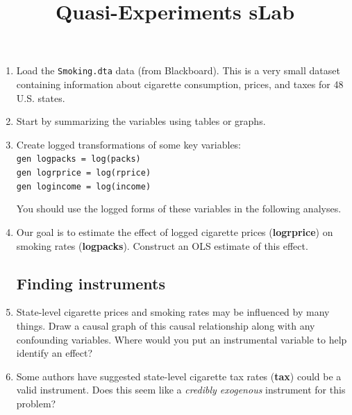 \documentclass[a4paper,12pt]{article}
\title{Quasi-Experiments sLab}
\author{}
\date{}
\begin{document}
\maketitle

\vspace{-4em}

\begin{enumerate}\itemsep0.5em

\section*{Instrumental Variables}

\item Load the \texttt{Smoking.dta} data (from Blackboard). This is a very small dataset containing information about cigarette consumption, prices, and taxes for 48 U.S. states.

\item Start by summarizing the variables using tables or graphs.

\item Create logged transformations of some key variables:\\
\texttt{gen logpacks = log(packs)\\
gen logrprice = log(rprice)\\
gen logincome = log(income)}

You should use the logged forms of these variables in the following analyses.

\item Our goal is to estimate the effect of logged cigarette prices (\textbf{logrprice}) on smoking rates (\textbf{logpacks}). Construct an OLS estimate of this effect.

\subsection*{Finding instruments}

\item State-level cigarette prices and smoking rates may be influenced by many things. Draw a causal graph of this causal relationship along with any confounding variables. Where would you put an instrumental variable to help identify an effect?

\item Some authors have suggested state-level cigarette tax rates (\textbf{tax}) could be a valid instrument. Does this seem like a {\em credibly exogenous} instrument for this problem?


\end{enumerate}
\end{document}

